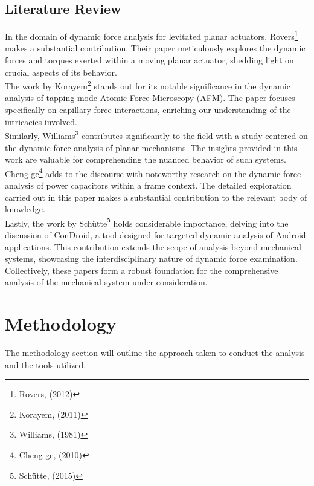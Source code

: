 \documentclass[12pt, titlepage]{article}
\begin{document}
\subsection{Literature Review}
In the domain of dynamic force analysis for levitated planar actuators,
Rovers\footnote{Rovers, (2012)} makes a substantial contribution. Their paper
meticulously explores the dynamic forces and torques exerted within a moving
planar actuator, shedding light on crucial aspects of its behavior.\\[10pt]
The work by Korayem\footnote{Korayem, (2011)} stands out for its notable
significance in the dynamic analysis of tapping-mode Atomic Force Microscopy
(AFM). The paper focuses specifically on capillary force interactions,
enriching our understanding of the intricacies involved.\\[10pt]
Similarly, Williams\footnote{Williams, (1981)} contributes significantly to the
field with a study centered on the dynamic force analysis of planar mechanisms.
The insights provided in this work are valuable for comprehending the nuanced
behavior of such systems.\\[10pt]
Cheng-ge\footnote{Cheng-ge, (2010)} adds to the discourse with noteworthy
research on the dynamic force analysis of power capacitors within a frame
context. The detailed exploration carried out in this paper makes a substantial
contribution to the relevant body of knowledge.\\[10pt]
Lastly, the work by Schütte\footnote{Schütte, (2015)} holds considerable
importance, delving into the discussion of ConDroid, a tool designed for
targeted dynamic analysis of Android applications. This contribution extends
the scope of analysis beyond mechanical systems, showcasing the
interdisciplinary nature of dynamic force examination.\\[10pt]
Collectively, these papers form a robust foundation for the comprehensive analysis of the mechanical system under consideration.
\newpage
\section{Methodology}
The methodology section will outline the approach taken to conduct the analysis
and the tools utilized.
\end{document}
